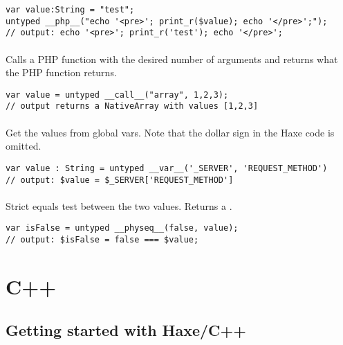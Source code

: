\begin{lstlisting}
var value:String = "test";
untyped __php__("echo '<pre>'; print_r($value); echo '</pre>';");
// output: echo '<pre>'; print_r('test'); echo '</pre>';
\end{lstlisting}

\paragraph{}
Calls a PHP function with the desired number of arguments and returns what the PHP function returns.

\begin{lstlisting}
var value = untyped __call__("array", 1,2,3); 
// output returns a NativeArray with values [1,2,3]
\end{lstlisting}

\paragraph{}
Get the values from global vars. Note that the dollar sign in the Haxe code is omitted.

\begin{lstlisting}
var value : String = untyped __var__('_SERVER', 'REQUEST_METHOD')  
// output: $value = $_SERVER['REQUEST_METHOD']
\end{lstlisting}

\paragraph{}
Strict equals test between the two values. Returns a .

\begin{lstlisting}
var isFalse = untyped __physeq__(false, value);
// output: $isFalse = false === $value;
\end{lstlisting}


\section{C++}
\label{target-cpp}


\subsection{Getting started with Haxe/C++}
\label{target-cpp-getting-started}

